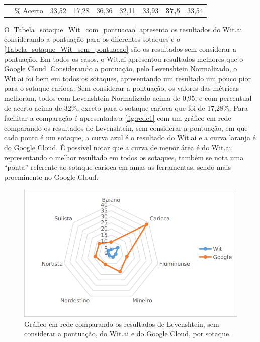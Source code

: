 \begin{quadro}[h]
\begin{tabular}{c|c|r|r|r|r|r|r|r|}
\multicolumn{1}{l|}{}                                                                                    & \% Acerto & 33,52                       & 17,28                        & 36,36                      & 32,11                        & 33,93                      & \textbf{37,5}                          & 33,54                        \\ \cline{2-9} 
\end{tabular}
\end{quadro}
\FloatBarrier



O \autoref{Tabela_sotaque_Wit_com_pontuacao} apresenta os resultados do Wit.ai considerando a pontuação para os diferentes sotaques e o \autoref{Tabela_sotaque_Wit_sem_pontuacao} são os resultados sem considerar a pontuação. Em todos os casos, o Wit.ai apresentou resultados melhores que o Google Cloud. Considerando a pontuação, pelo Levenshtein Normalizado, o Wit.ai foi bem em todos os sotaques, apresentando um resultado um pouco pior para o sotaque carioca. Sem considerar a pontuação, os valores das métricas melhoram, todos com Levenshtein Normalizado acima de 0,95, e com percentual de acerto acima de 32\%, exceto para o sotaque carioca que foi de 17,28\%. Para facilitar a comparação é apresentada a \autoref{fig:rede1} com um gráfico em rede comparando os resultados de Levenshtein, sem considerar a pontuação, em que cada ponta é um sotaque, a curva azul é o resultado do Wit.ai e a curva laranja é do Google Cloud. É possível notar que a curva de menor área é do Wit.ai, representando o melhor resultado em todos os sotaques, também se nota uma ``ponta'' referente ao sotaque carioca em amas as ferramentas, sendo mais proeminente no Google Cloud.


\begin{figure}[h!]
\centering
\caption{Gráfico em rede comparando os resultados de Levenshtein, sem considerar a pontuação, do Wit.ai e do Google Cloud, por sotaque.}
\label{fig:rede1}
\includegraphics[width=.75\textwidth]{images/Lev_sotque_compont.png}
\end{figure}

